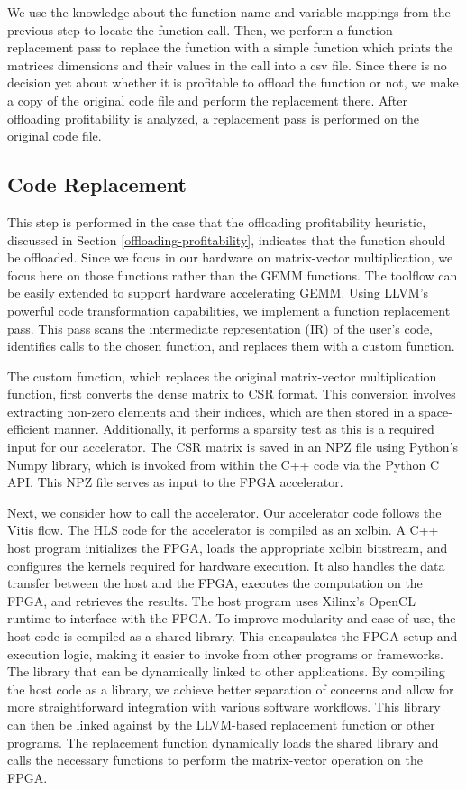 \documentclass[manuscript,screen,review]{acmart}
\begin{document}
We use the knowledge about the function name and variable mappings from the previous step to locate the function call. Then, we perform a function replacement pass to replace the function with a simple function which prints the matrices dimensions and their values in the call into a csv file. Since there is no decision yet about whether it is profitable to offload the function or not, we make a copy of the original code file and perform the replacement there. After offloading profitability is analyzed, a replacement pass is performed on the original code file.

\subsection{Code Replacement}

This step is performed in the case that the offloading profitability heuristic, discussed in Section \ref{offloading-profitability}, indicates that the function should be offloaded. Since we focus in our hardware on matrix-vector multiplication, we focus here on those functions rather than the GEMM functions. The toolflow can be easily extended to support hardware accelerating GEMM. Using LLVM’s powerful code transformation capabilities, we implement a function replacement pass. This pass scans the intermediate representation (IR) of the user’s code, identifies calls to the chosen function, and replaces them with a custom function. 

The custom function, which replaces the original matrix-vector multiplication function, first converts the dense matrix to CSR format. This conversion involves extracting non-zero elements and their indices, which are then stored in a space-efficient manner. Additionally, it performs a sparsity test as this is a required input for our accelerator. The CSR matrix is saved in an NPZ file using Python’s Numpy library, which is invoked from within the C++ code via the Python C API. This NPZ file serves as input to the FPGA accelerator.

Next, we consider how to call the accelerator. Our accelerator code follows the Vitis flow. The HLS code for the accelerator is compiled as an xclbin. A C++ host program initializes the FPGA, loads the appropriate xclbin bitstream, and configures the kernels required for hardware execution. It also handles the data transfer between the host and the FPGA, executes the computation on the FPGA, and retrieves the results. The host program uses Xilinx's OpenCL runtime to interface with the FPGA. To improve modularity and ease of use, the host code is compiled as a shared library. This encapsulates the FPGA setup and execution logic, making it easier to invoke from other programs or frameworks. The library that can be dynamically linked to other applications. By compiling the host code as a library, we achieve better separation of concerns and allow for more straightforward integration with various software workflows. This library can then be linked against by the LLVM-based replacement function or other programs. The replacement function dynamically loads the shared library and calls the necessary functions to perform the matrix-vector  operation on the FPGA.
\end{document}
